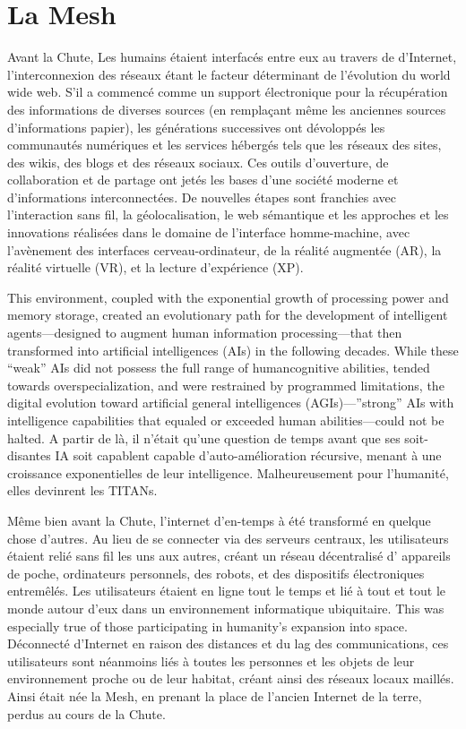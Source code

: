 \chapter{La Mesh} \label{cha:mesh} 

Avant la Chute, Les humains étaient interfacés entre eux au travers de d'Internet, l'interconnexion des réseaux étant le facteur déterminant de l'évolution du world wide web. S'il a commencé comme un support électronique pour la récupération des informations de diverses sources (en remplaçant même les anciennes sources d'informations papier), les générations successives ont dévoloppés les communautés numériques et les services hébergés tels que les réseaux des sites, des wikis, des blogs et des réseaux sociaux. Ces outils d'ouverture, de collaboration et de partage ont jetés les bases d'une société moderne et d'informations interconnectées. De nouvelles étapes sont franchies avec l'interaction sans fil, la géolocalisation, le web sémantique et les approches et les innovations réalisées dans le domaine de l'interface homme-machine, avec l'avènement des interfaces cerveau-ordinateur, de la réalité augmentée (AR), la réalité virtuelle (VR), et la lecture d'expérience (XP). 

This environment, coupled with the exponential growth of processing power and memory storage, created an evolutionary path for the development of intelligent agents—designed to augment human information processing—that then transformed into artificial intelligences (AIs) in the following decades. While these “weak” AIs did not possess the full range of humancognitive abilities, tended towards overspecialization, and were restrained by programmed limitations, the digital evolution toward artificial general intelligences (AGIs)—”strong” AIs with intelligence capabilities that equaled or exceeded human abilities—could not be halted. A partir de là, il n'était qu'une question de temps avant que ses soit-disantes IA soit capablent capable d'auto-amélioration récursive, menant à une croissance exponentielles de leur intelligence. Malheureusement pour l'humanité, elles devinrent les TITANs. 

Même bien avant la Chute, l'internet d'en-temps à été transformé en quelque chose d'autres. Au lieu de se connecter via des serveurs centraux, les utilisateurs étaient relié sans fil les uns aux autres, créant un réseau décentralisé d' appareils de poche, ordinateurs personnels, des robots, et des dispositifs électroniques entremêlés. Les utilisateurs étaient en ligne tout le temps et lié à tout et tout le monde autour d'eux dans un environnement informatique ubiquitaire. This was especially true of those participating in humanity’s expansion into space. Déconnecté d'Internet en raison des distances et du lag des communications, ces utilisateurs sont néanmoins liés à toutes les personnes et les objets de leur environnement proche ou de leur habitat, créant ainsi des réseaux locaux maillés. Ainsi était née la Mesh, en prenant la place de l'ancien Internet de la terre, perdus au cours de la Chute. 


